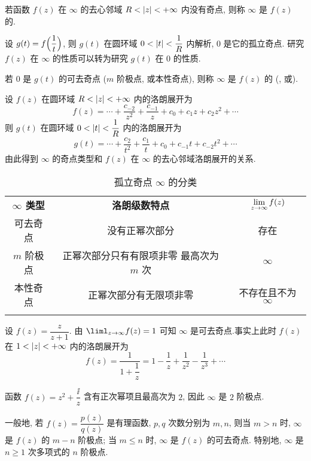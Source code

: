 \begin{definition}
  若函数 $f(z)$ 在 $\infty$ 的去心邻域 $R<\left|z\right|<+\infty$ 内没有奇点, 则称 $\infty$ 是 $f(z)$ 的.
\end{definition}

设 $g(t)=f\Bigl(\dfrac1t\Bigr)$, 则 $g(t)$ 在圆环域 $0<\left|t\right|<\dfrac1R$ 内解析, $0$ 是它的孤立奇点.
研究 $f(z)$ 在 $\infty$ 的性质可以转为研究 $g(t)$ 在 $0$ 的性质.

\begin{definition}
  若 $0$ 是 $g(t)$ 的可去奇点 ($m$ 阶极点, 或本性奇点), 则称 $\infty$ 是 $f(z)$ 的 (, 或).
\end{definition}

设 $f(z)$ 在圆环域 $R<\left|z\right|<+\infty$ 内的洛朗展开为
\[
  f(z)=\cdots+\frac{c_{-2}}{z^2}+\frac{c_{-1}}{z}+c_0+c_1z+c_2z^2+\cdots
\]
则 $g(t)$ 在圆环域 $0<\left|t\right|<\dfrac1R$ 内的洛朗展开为
\[
  g(t)=\cdots+\frac{c_2}{t^2}+\frac{c_1}t+c_0+c_{-1}t+c_{-2}t^2+\cdots
\]
由此得到 $\infty$ 的奇点类型和 $f(z)$ 在 $\infty$ 的去心邻域洛朗展开的关系.

\begin{table}[H]
  \centering
  \begin{tabular}{ccc}
    \topcolorrule
      \bf $\infty$ 类型&
      \bf 洛朗级数特点&
      $\lim\limits_{z\rightarrow\infty}f(z)$\\ 
    \topcolorrule
      可去奇点&
      没有正幂次部分&
      存在\\
    \midcolorrule
      $m$ 阶极点&
      \makecell{正幂次部分只有有限项非零\\最高次为 $m$ 次}&
      $\infty$\\
    \midcolorrule
      本性奇点&
      正幂次部分有无限项非零&
      不存在且不为 $\infty$\\ 
    \bottomcolorrule
  \end{tabular}
  \caption{孤立奇点 $\infty$ 的分类}
\end{table}

\begin{exampleenum}
  \item 设 $f(z)=\dfrac z{z+1}$. \smallskip
  由 $\liml_{z\ra\infty}f(z)=1$ 可知 $\infty$ 是可去奇点.事实上此时 $f(z)$ 在 $1<\left|z\right|<+\infty$ 内的洛朗展开为
  \[
      f(z)=\frac{1}{1+\dfrac1z}
    =1-\frac1z+\frac1{z^2}-\frac1{z^3}+\cdots
  \]
  \item 函数 $f(z)=z^2+\dfrac\ii z$ 含有正次幂项且最高次为 $2$, 因此 $\infty$ 是 $2$ 阶极点.
  \smallskip

  一般地, 若 $f(z)=\dfrac{p(z)}{q(z)}$ 是有理函数, $p,q$ 次数分别为 $m,n$, 则当 $m>n$ 时, $\infty$ 是 $f(z)$ 的 $m-n$ 阶极点;
  当 $m\le n$ 时, $\infty$ 是 $f(z)$ 的可去奇点.
  特别地, $\infty$ 是 $n\ge1$ 次多项式的 $n$ 阶极点.
\end{exampleenum}

